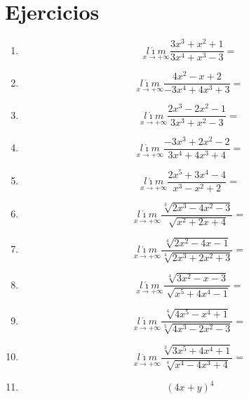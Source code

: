 \documentclass[oneside,spanish,letter]{article}
\begin{document}
\section{Ejercicios}
\begin{enumerate}
 \item $$\underset{x\rightarrow +\infty}{l\acute{\imath}m} \frac{3x^3+x^2+1}{3x^4+x^3-3}=$$
 \item $$\underset{x\rightarrow +\infty}{l\acute{\imath}m} \frac{4x^2-x+2}{-3x^4+4x^3+3}=$$
 \item $$\underset{x\rightarrow +\infty}{l\acute{\imath}m} \frac{2x^3-2x^2-1}{3x^3+x^2-3}=$$
 \item $$\underset{x\rightarrow +\infty}{l\acute{\imath}m} \frac{-3x^3+2x^2-2}{3x^4+4x^3+4}=$$
 \item $$\underset{x\rightarrow +\infty}{l\acute{\imath}m} \frac{2x^5+3x^4-4}{x^3-x^2+2}=$$
 \item $$\underset{x\rightarrow +\infty}{l\acute{\imath}m} \frac{\sqrt[3]{2x^3-4x^2-3}}{\sqrt[]{x^2+2x+4}}=$$
 \item $$\underset{x\rightarrow +\infty}{l\acute{\imath}m} \frac{\sqrt[4]{2x^2-4x-1}}{\sqrt[4]{2x^3+2x^2+3}}=$$
 \item $$\underset{x\rightarrow +\infty}{l\acute{\imath}m} \frac{\sqrt[4]{3x^2-x-3}}{\sqrt[]{x^5+4x^4-1}}=$$
 \item $$\underset{x\rightarrow +\infty}{l\acute{\imath}m} \frac{\sqrt[4]{4x^5-x^4+1}}{\sqrt[5]{4x^3-2x^2-3}}=$$
 \item $$\underset{x\rightarrow +\infty}{l\acute{\imath}m} \frac{\sqrt[3]{3x^5+4x^4+1}}{\sqrt[4]{x^4-4x^3+4}}=$$
\item $$(4x+y)^4$$
 \end{enumerate}
  \newpage
\end{document}
